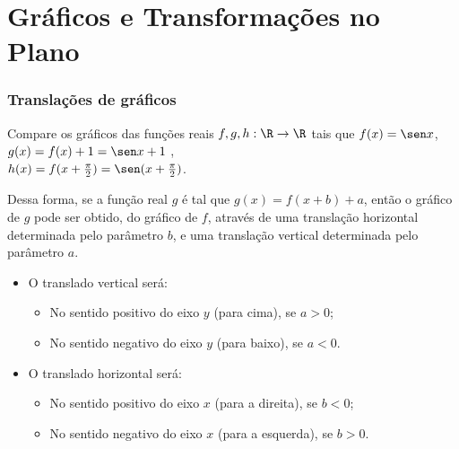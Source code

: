 \documentclass[10pt]{beamer}
\begin{document}
\section{Gráficos e Transformações no Plano}
\begin{frame}
\frametitle{Translações de gráficos} 

\begin{exemplo}
Compare os gráficos das funções reais $f, g , h: \R \to \R$ tais que
$f(x) = \sen x$, \\ $g(x) = f(x) + 1 = \sen x +1$ , \\ $h(x)=
f(x+\frac {\pi} 2)= \sen (x+ \frac {\pi} 2)$.
\end{exemplo}\pause

Dessa forma, se a função real $g$ é tal que $g(x) = f(x+b) +a$,
então o gráfico de $g$ pode ser obtido, do gráfico de $f$, através
de uma translação horizontal determinada pelo parâmetro $b$, e uma
translação vertical determinada pelo parâmetro $a$. \pause
\begin{itemize}
	\item O translado vertical será:
				\begin{itemize}
					\item No sentido positivo do eixo $y$ (para cima), se
					$a>0$;
					\item No sentido negativo do eixo $y$ (para baixo), se
					$a<0$.
				\end{itemize} \pause
	\item O translado horizontal será:
				\begin{itemize}
					\item No sentido positivo do eixo $x$ (para a direita), se $b<0$;
					\item No sentido negativo do eixo $x$ (para a esquerda), se $b>0$.
				\end{itemize}
\end{itemize}


\end{frame}

\end{document}
